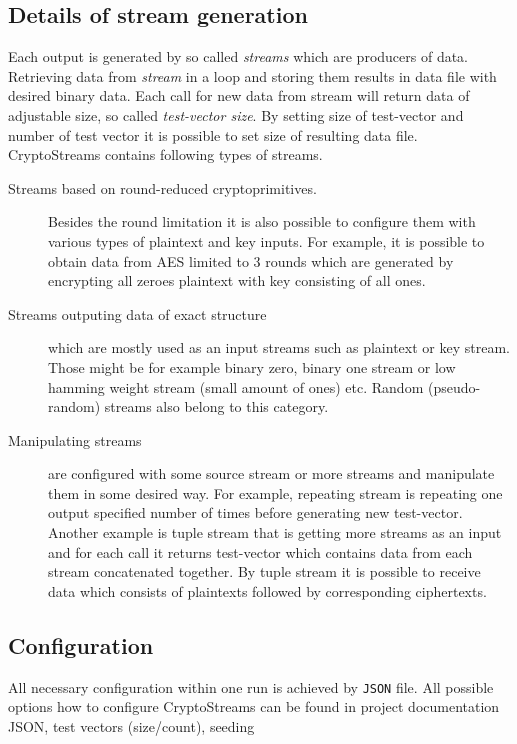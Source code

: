 \documentclass[
    digital,    %
    oneside,    %
    color,
    11pt,
    nocover,
    notable,
    nolof,
    nolot,
    final
]{fithesis3}
\begin{document}
\subsection{Details of stream generation}

Each output is generated by so called \textit{streams} which are producers of data. Retrieving data from \textit{stream} in a loop and storing them results in data file with desired binary data. Each call for new data from stream will return data of adjustable size, so called \textit{test-vector size}. By setting size of test-vector and number of test vector it is possible to set size of resulting data file. CryptoStreams contains following types of streams.

\begin{description}
	\item[Streams based on round-reduced cryptoprimitives.] Besides the round limitation it is also possible to configure them with various types of plaintext and key inputs. For example, it is possible to obtain data from AES limited to 3 rounds which are generated by encrypting all zeroes plaintext with key consisting of all ones. 
	\item[Streams outputing data of exact structure] which are mostly used as an input streams such as plaintext or key stream. Those might be for example binary zero, binary one stream or low hamming weight stream (small amount of ones) etc. Random (pseudo-random) streams also belong to this category.
	\item[Manipulating streams] are configured with some source stream or more streams and manipulate them in some desired way. For example, repeating stream is repeating one output specified number of times before generating new test-vector. Another example is tuple stream that is getting more streams as an input and for each call it returns test-vector which contains data from each stream concatenated together. By tuple stream it is possible to receive data which consists of plaintexts followed by corresponding ciphertexts. 
\end{description}


\subsection{Configuration}

All necessary configuration within one run is achieved by \texttt{JSON} file. All possible options how to configure CryptoStreams can be found in project documentation~\cite{CryptoStreams-wiki}
JSON, test vectors (size/count), seeding
\end{document}
